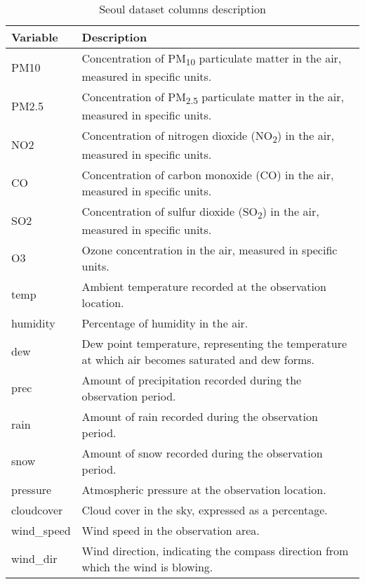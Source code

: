 \begin{table}[ht]

    \centering
    \begin{tabular}{|p{3cm}|p{9cm}|}
        \hline
        \textbf{Variable} & \textbf{Description} \\
        \hline
        PM10 & Concentration of PM\textsubscript{10} particulate matter in the air, measured in specific units. \\
        PM2.5 & Concentration of PM\textsubscript{2.5} particulate matter in the air, measured in specific units. \\
        NO2 & Concentration of nitrogen dioxide (NO\textsubscript{2}) in the air, measured in specific units. \\
        CO & Concentration of carbon monoxide (CO) in the air, measured in specific units. \\
        SO2 & Concentration of sulfur dioxide (SO\textsubscript{2}) in the air, measured in specific units. \\
        O3 & Ozone concentration in the air, measured in specific units. \\
        temp & Ambient temperature recorded at the observation location. \\
        humidity & Percentage of humidity in the air. \\
        dew & Dew point temperature, representing the temperature at which air becomes saturated and dew forms. \\
        prec & Amount of precipitation recorded during the observation period. \\
        rain & Amount of rain recorded during the observation period. \\
        snow & Amount of snow recorded during the observation period. \\
        pressure & Atmospheric pressure at the observation location. \\
        cloudcover & Cloud cover in the sky, expressed as a percentage. \\
        wind\_speed & Wind speed in the observation area. \\
        wind\_dir & Wind direction, indicating the compass direction from which the wind is blowing. \\
        \hline
    \end{tabular}
    \caption{Seoul dataset columns description}
    \label{apptable:madrid_variable_description}
\end{table}

